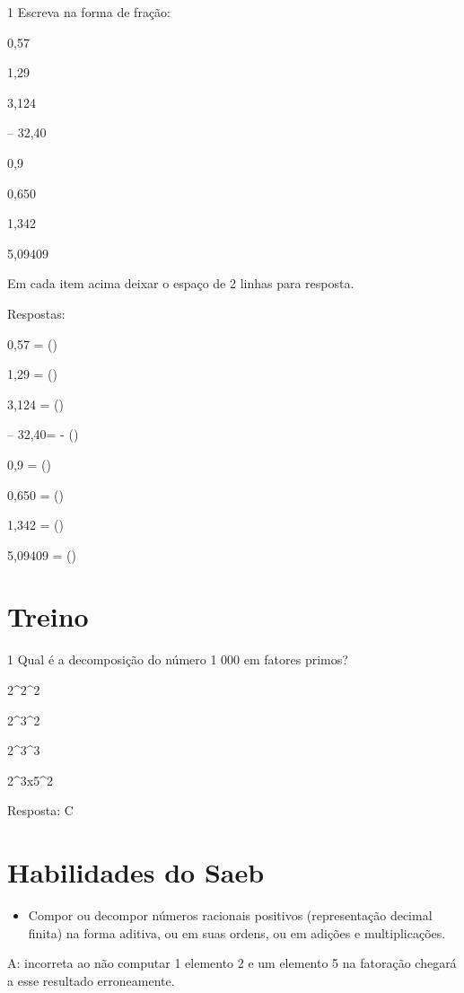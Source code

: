 \num{1} Escreva na forma de fração:

\item 0,57
\item 1,29
\item 3,124
\item -- 32,40
\item 0,9
\item 0,650
\item 1,342
\item 5,09409

Em cada item acima deixar o espaço de 2 linhas para resposta.

Respostas:

\item 0,57 = ()
\item 1,29 = ()
\item 3,124 = ()
\item -- 32,40= - ()
\item 0,9 = ()
\item 0,650 = ()
\item 1,342 = ()
\item 5,09409 = ()

\section{Treino}

\num{1} Qual é a decomposição do número 1 000 em fatores primos?

\item 2^2^2
\item 2^3^2
\item 2^3^3
\item 2^3x5^2

Resposta: C

\section{Habilidades do Saeb}

\begin{itemize}
\item 
  Compor ou decompor números racionais positivos (representação decimal
  finita) na forma aditiva, ou em suas ordens, ou em adições e
  multiplicações.
\end{itemize}

A: incorreta ao não computar 1 elemento 2 e um elemento 5 na fatoração
chegará a esse resultado erroneamente.

